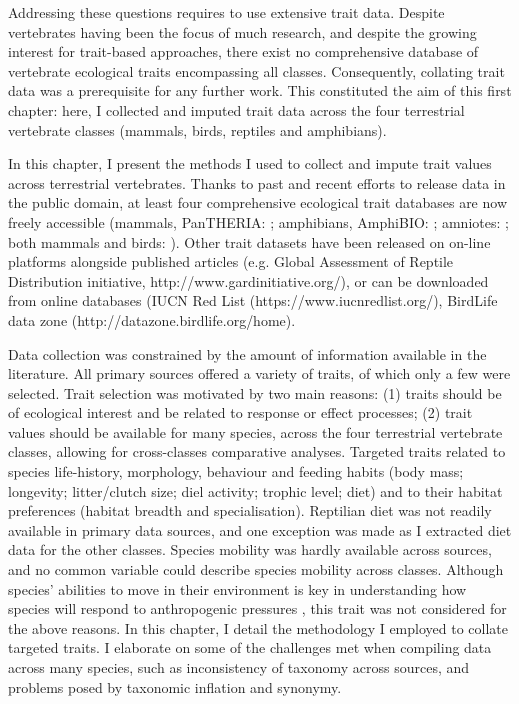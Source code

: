 Addressing these questions requires to use extensive trait data. Despite vertebrates having been the focus of much research, and despite the growing interest for trait-based approaches, there exist no comprehensive database of vertebrate ecological traits encompassing all classes. Consequently, collating trait data was a prerequisite for any further work. This constituted the aim of this first chapter: here, I collected and imputed trait data across the four terrestrial vertebrate classes (mammals, birds, reptiles and amphibians).

In this chapter, I present the methods I used to collect and impute trait values across terrestrial vertebrates. Thanks to past and recent efforts to release data in the public domain, at least four comprehensive ecological trait databases are now freely accessible (mammals, PanTHERIA: \citet{Jones2009}; amphibians, AmphiBIO: \citet{Oliveira2017}; amniotes: \citet{Myhrvold2015}; both mammals and birds: \citet{Cooke2019}). Other trait datasets have been released on on-line platforms alongside published articles (e.g. Global Assessment of Reptile Distribution initiative, http://www.gardinitiative.org/), or can be downloaded from online databases (IUCN Red List (https://www.iucnredlist.org/), BirdLife data zone (http://datazone.birdlife.org/home). 

Data collection was constrained by the amount of information available in the literature.  All  primary sources offered a variety of traits, of which only a few were selected. Trait selection was motivated by two main reasons: (1) traits should be of ecological interest and be related to response or effect processes; (2) trait values should be available for many species, across the four terrestrial vertebrate classes, allowing for cross-classes comparative analyses. Targeted traits related to species life-history, morphology, behaviour and feeding habits (body mass; longevity; litter/clutch size; diel activity; trophic level; diet) and to their habitat preferences (habitat breadth and specialisation). Reptilian diet was not readily available in primary data sources, and one exception was made as I extracted diet data for the other classes. Species mobility was hardly available across sources, and no common variable could describe species mobility across classes. Although species' abilities to move in their environment is key in understanding how species will respond to anthropogenic pressures \citep{Schloss2012b, Barbet-Massin2012,Pearson2006}, this trait was not considered for the above reasons. In this chapter, I detail the methodology I employed to collate targeted traits. I elaborate on some of the challenges met when compiling data across many species, such as inconsistency of taxonomy across sources, and problems posed by taxonomic inflation and synonymy.

